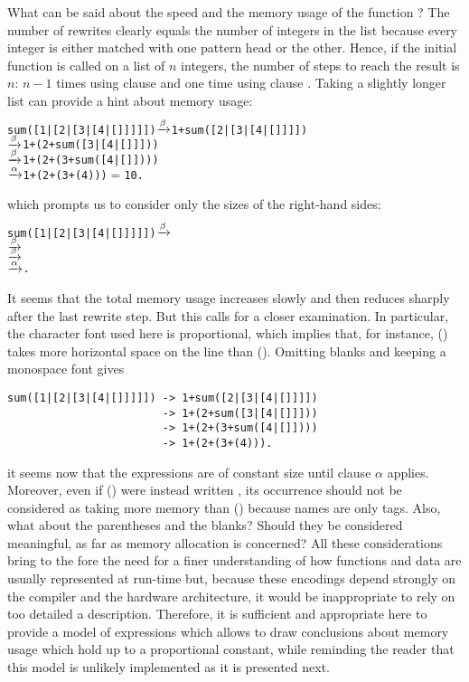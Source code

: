 What can be said about the speed and the memory usage of the function
? The number of rewrites clearly equals the number of
integers in the list because every integer is either matched with one
pattern head or the other. Hence, if the initial function is called on
a list of \(n\) integers, the number of steps to reach the result is
\(n\): \(n-1\) times using clause \clause{\beta} and one time using
clause \clause{\alpha}. Taking a slightly longer list can provide a
hint about memory usage:
\begin{alltt}
sum([1|[2|[3|[4|[]]]]]) \(\xrightarrow{\smash[t]{\beta}}\) 1 + sum([2|[3|[4|[]]]])
                        \(\xrightarrow{\smash[t]{\beta}}\) 1 + (2 + sum([3|[4|[]]]))
                        \(\xrightarrow{\smash[t]{\beta}}\) 1 + (2 + (3 + sum([4|[]])))
                        \(\xrightarrow{\smash[t]{\alpha}}\) 1 + (2 + (3 + (4)))       \(=\) 10\textrm{.}
\end{alltt}
which prompts us to consider only the sizes of the right\hyp{}hand
sides:
\begin{alltt}
sum([1|[2|[3|[4|[]]]]]) \(\xrightarrow{\smash[t]{\beta}}\) 
                        \(\xrightarrow{\smash[t]{\beta}}\) 
                        \(\xrightarrow{\smash[t]{\beta}}\) 
                        \(\xrightarrow{\smash[t]{\alpha}}\) \textrm{.}
\end{alltt}
It seems that the total memory usage increases slowly and then reduces
sharply after the last rewrite step. But this calls for a closer
examination. In particular, the character font used here is
proportional, which implies that, for instance, (\erlcode{+}) takes
more horizontal space on the line than (\erlcode{|}). Omitting blanks
and keeping a monospace font gives
\begin{verbatim}
sum([1|[2|[3|[4|[]]]]]) -> 1+sum([2|[3|[4|[]]]])
                        -> 1+(2+sum([3|[4|[]]]))
                        -> 1+(2+(3+sum([4|[]])))
                        -> 1+(2+(3+(4))).
\end{verbatim}
it seems now that the expressions are of constant size until clause
\(\alpha\) applies. Moreover, even if (\erlcode{+}) were instead
written , its occurrence should not be considered as
taking more memory than (\erlcode{+}) because names are only
tags. Also, what about the parentheses and the blanks? Should they be
considered meaningful, as far as memory allocation is concerned? All
these considerations bring to the fore the need for a finer
understanding of how \Erlang functions and data are usually
represented at run\hyp{}time but, because these encodings depend
strongly on the compiler and the hardware architecture, it would be
inappropriate to rely on too detailed a description. Therefore, it is
sufficient and appropriate here to provide a model of expressions
which allows to draw conclusions about memory usage which hold up to a
proportional constant, while reminding the reader that this model is
unlikely implemented as it is presented next.

